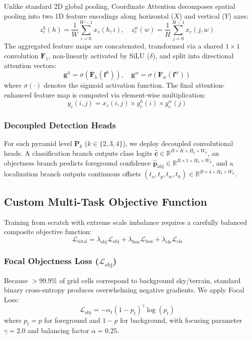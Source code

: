 \documentclass[10pt,conference,letterpaper,twocolumn]{article}
\begin{document}
Unlike standard 2D global pooling, Coordinate Attention decomposes spatial pooling into two 1D feature encodings along horizontal ($X$) and vertical ($Y$) axes:
\begin{equation}
z_c^h(h) = \frac{1}{W} \sum_{i=0}^{W-1} x_c(h, i), \quad z_c^w(w) = \frac{1}{H} \sum_{j=0}^{H-1} x_c(j, w)
\end{equation}
The aggregated feature maps are concatenated, transformed via a shared $1\times 1$ convolution $\mathbf{F}_1$, non-linearly activated by SiLU ($\delta$), and split into directional attention vectors:
\begin{equation}
\mathbf{g}^h = \sigma\left(\mathbf{F}_h(\mathbf{f}^h)\right), \quad \mathbf{g}^w = \sigma\left(\mathbf{F}_w(\mathbf{f}^w)\right)
\end{equation}
where $\sigma(\cdot)$ denotes the sigmoid activation function. The final attention-enhanced feature map is computed via element-wise multiplication:
\begin{equation}
y_c(i, j) = x_c(i, j) \times g_c^h(i) \times g_c^w(j)
\end{equation}

\subsubsection{Decoupled Detection Heads}
For each pyramid level $\mathbf{P}_k$ ($k \in \{2, 3, 4\}$), we deploy decoupled convolutional heads. A classification branch outputs class logits $\hat{\mathbf{c}} \in \mathbb{R}^{B \times K \times H_k \times W_k}$, an objectness branch predicts foreground confidence $\hat{\mathbf{p}}_{\text{obj}} \in \mathbb{R}^{B \times 1 \times H_k \times W_k}$, and a localization branch outputs continuous offsets $(t_x, t_y, t_w, t_h) \in \mathbb{R}^{B \times 4 \times H_k \times W_k}$.

\subsection{Custom Multi-Task Objective Function}
Training from scratch with extreme scale imbalance requires a carefully balanced composite objective function:
\begin{equation}
\mathcal{L}_{\text{total}} = \lambda_{\text{obj}} \mathcal{L}_{\text{obj}} + \lambda_{\text{box}} \mathcal{L}_{\text{box}} + \lambda_{\text{cls}} \mathcal{L}_{\text{cls}}
\end{equation}

\subsubsection{Focal Objectness Loss ($\mathcal{L}_{\text{obj}}$)}
Because $>99.9\%$ of grid cells correspond to background sky/terrain, standard binary cross-entropy produces overwhelming negative gradients. We apply Focal Loss:
\begin{equation}
\mathcal{L}_{\text{obj}} = -\alpha_t (1 - p_t)^\gamma \log(p_t)
\end{equation}
where $p_t = p$ for foreground and $1-p$ for background, with focusing parameter $\gamma=2.0$ and balancing factor $\alpha=0.25$.
\end{document}
